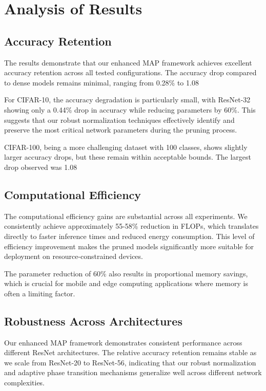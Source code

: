 \documentclass[12pt,a4paper]{report}
\begin{document}
\section{Analysis of Results}

\subsection{Accuracy Retention}
The results demonstrate that our enhanced MAP framework achieves excellent accuracy retention across all tested configurations. The accuracy drop compared to dense models remains minimal, ranging from 0.28\% to 1.08%

For CIFAR-10, the accuracy degradation is particularly small, with ResNet-32 showing only a 0.44\% drop in accuracy while reducing parameters by 60\%. This suggests that our robust normalization techniques effectively identify and preserve the most critical network parameters during the pruning process.

CIFAR-100, being a more challenging dataset with 100 classes, shows slightly larger accuracy drops, but these remain within acceptable bounds. The largest drop observed was 1.08%

\subsection{Computational Efficiency}
The computational efficiency gains are substantial across all experiments. We consistently achieve approximately 55-58\% reduction in FLOPs, which translates directly to faster inference times and reduced energy consumption. This level of efficiency improvement makes the pruned models significantly more suitable for deployment on resource-constrained devices.

The parameter reduction of 60\% also results in proportional memory savings, which is crucial for mobile and edge computing applications where memory is often a limiting factor.

\subsection{Robustness Across Architectures}
Our enhanced MAP framework demonstrates consistent performance across different ResNet architectures. The relative accuracy retention remains stable as we scale from ResNet-20 to ResNet-56, indicating that our robust normalization and adaptive phase transition mechanisms generalize well across different network complexities.
\end{document}

